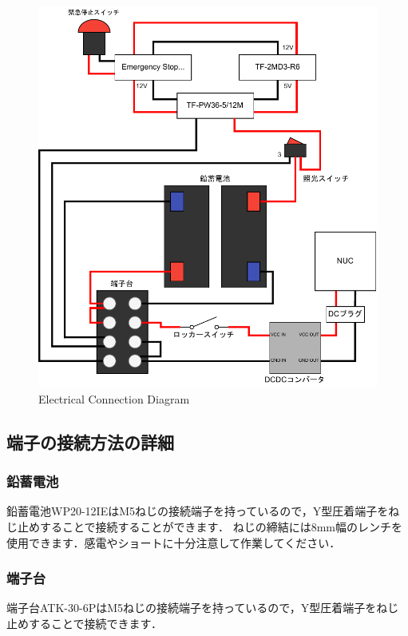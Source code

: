 \documentclass[{../../master}]{subfiles}
\begin{document}
  \begin{figure}[ht]
    \centering
    \includegraphics[width=100truemm, clip]{images/electrical_connections.drawio.pdf}
    \caption{Electrical Connection Diagram}
    \label{fig:electrical_connection_diagram}
  \end{figure}

  \subsection{端子の接続方法の詳細}

  \subsubsection{鉛蓄電池}
  鉛蓄電池WP20-12IEはM5ねじの接続端子を持っているので，Y型圧着端子をねじ止めすることで接続することができます．  
  ねじの締結には8mm幅のレンチを使用できます．感電やショートに十分注意して作業してください．

  \subsubsection{端子台}
  端子台ATK-30-6PはM5ねじの接続端子を持っているので，Y型圧着端子をねじ止めすることで接続できます．
\end{document}
